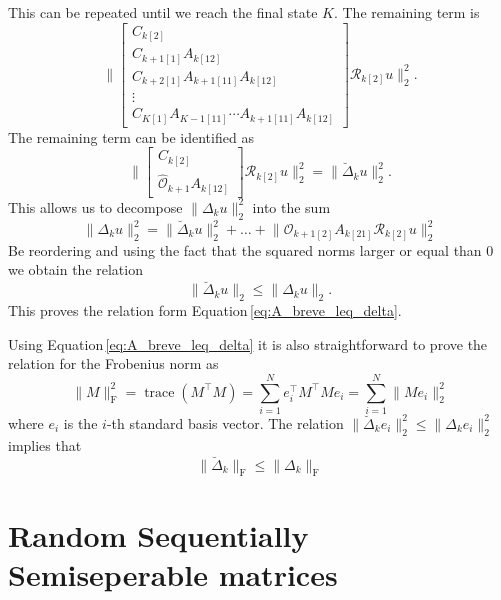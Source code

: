 \documentclass[doctype=mastersthesis,BCOR=15mm,biblatex]{ldvbook}%
\DeclareMathOperator{\trace}{trace}
\newcommand{\R}{\mathcal{R}} %
\newcommand{\Ob}{\mathcal{O}} %
\begin{document}
This can be repeated until we reach the final state $K$.
The remaining term is 
\begin{equation}
	\Bigg\|
	\begin{bmatrix}
	C_{k[2]}\\
	C_{k+1[1]}A_{k[12]}\\
	C_{k+2[1]}A_{k+1[11]}A_{k[12]}\\
	\vdots\\
	C_{K[1]}A_{K-1[11]}\cdots  A_{k+1[11]} A_{k[12]}
	\end{bmatrix}  \R_{k[2]} u
	\Bigg\|_2^2
	.
\end{equation}
The remaining term can be identified as 
\begin{equation}
\Bigg\|
\begin{bmatrix}
C_{k[2]}\\
\hat{\Ob}_{k+1}A_{k[12]}
\end{bmatrix}  \R_{k[2]} u
\Bigg\|_2^2
=
\Big\|\breve{\Delta}_k u\Big\|_2^2
.
\end{equation}
This allows us to decompose $\|\Delta_k u\|_2^2$ into the sum
\begin{equation}
\|\Delta_k u\|_2^2
	  =
	    \|\breve{\Delta}_k u\|_2^2
	  + \dots + \Big\|
	  \Ob_{k+1[2]}A_{k[21]}
	  \R_{k[2]} u
	  \Big\|_2^2
\end{equation}
Be reordering and using the fact that the squared norms larger or equal than $0$ we obtain the relation
\begin{equation}
	\|\breve{\Delta}_k u\|_2 \leq \|\Delta_k u\|_2 
	.
\end{equation}
This proves the relation form Equation\,\ref{eq:A_breve_leq_delta}.

Using Equation\,\ref{eq:A_breve_leq_delta} it is also straightforward to prove the relation for the Frobenius norm
as 
\begin{equation}
	\|M\|_\text{F}^2 = \trace(M^\top M) = \sum_{i=1}^{N} e_i^\top M^\top M e_i = \sum_{i=1}^{N} \|M e_i\|_2^2
\end{equation}
where $e_i$ is the $i$-th standard basis vector.
The relation $\|\breve{\Delta}_k e_i\|_2^2 \leq \|\Delta_k e_i\|_2^2$ implies that 
\begin{equation}
	\|\breve{\Delta}_k\|_\text{F} \leq \|\Delta_k\|_\text{F}
\end{equation}


\chapter{Random Sequentially Semiseperable matrices}\label{A:random_T}
\end{document}

